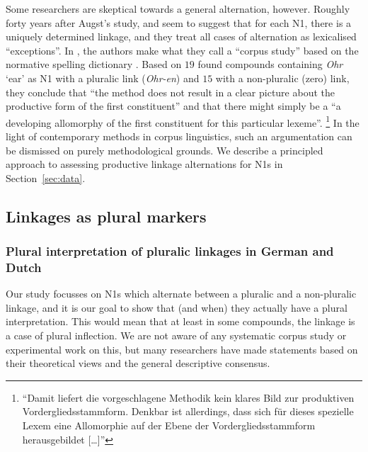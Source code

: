 Some researchers are skeptical towards a general alternation, however.
Roughly forty years after Augst's study, \textcite[31]{NeefBorgwaldt2012} and \textcite[46]{Neef2015} seem to suggest that for each N1, there is a uniquely determined linkage, and they treat all cases of alternation as lexicalised ``exceptions''.
In \textcite[42]{NeefBorgwaldt2012}, the authors make what they call a ``corpus study'' based on the normative spelling dictionary \textcite{Duden2006}.
Based on $19$ found compounds containing \textit{Ohr} `ear' as N1 with a pluralic link (\textit{Ohr-en}) and $15$ with a non-pluralic (zero) link, they conclude that ``the method does not result in a clear picture about the productive form of the first constituent'' and that there might simply be a ``a developing allomorphy of the first constituent for this particular lexeme''.%
\footnote{``Damit liefert die vorgeschlagene Methodik kein klares Bild zur produktiven Vordergliedsstammform.
Denkbar ist allerdings, dass sich für dieses spezielle Lexem eine Allomorphie auf der Ebene der Vordergliedsstammform herausgebildet [\ldots]''}
In the light of contemporary methods in corpus linguistics, such an argumentation can be dismissed on purely methodological grounds.
We describe a principled approach to assessing productive linkage alternations for N1s in Section~\ref{sec:data}.


\subsection{Linkages as plural markers}
\label{sec:linkagesaspluralmarkers}

\subsubsection{Plural interpretation of pluralic linkages in German and Dutch}

Our study focusses on N1s which alternate between a pluralic and a non-pluralic linkage, and it is our goal to show that (and when) they actually have a plural interpretation.
This would mean that at least in some compounds, the linkage is a case of plural inflection.
We are not aware of any systematic corpus study or experimental work on this, but many researchers have made statements based on their theoretical views and the general descriptive consensus.

